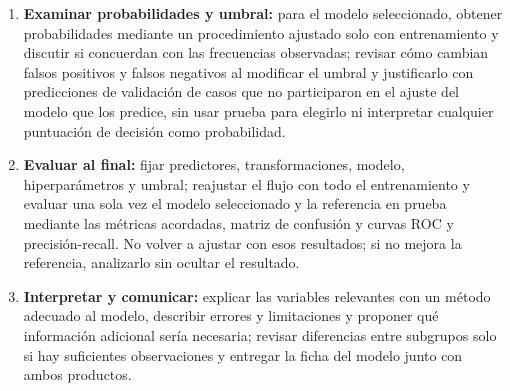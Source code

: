 \documentclass[a4,11pt]{aleph-notas}
\begin{document}
\begin{enumerate}[leftmargin=*, label={{\arabic*.}}]
    \item \textbf{Examinar probabilidades y umbral:} para el modelo seleccionado, obtener probabilidades mediante un procedimiento ajustado solo con entrenamiento y discutir si concuerdan con las frecuencias observadas; revisar cómo cambian falsos positivos y falsos negativos al modificar el umbral y justificarlo con predicciones de validación de casos que no participaron en el ajuste del modelo que los predice, sin usar prueba para elegirlo ni interpretar cualquier puntuación de decisión como probabilidad.
    \item \textbf{Evaluar al final:} fijar predictores, transformaciones, modelo, hiperparámetros y umbral; reajustar el flujo con todo el entrenamiento y evaluar una sola vez el modelo seleccionado y la referencia en prueba mediante las métricas acordadas, matriz de confusión y curvas ROC y precisión-recall. No volver a ajustar con esos resultados; si no mejora la referencia, analizarlo sin ocultar el resultado.
    \item \textbf{Interpretar y comunicar:} explicar las variables relevantes con un método adecuado al modelo, describir errores y limitaciones y proponer qué información adicional sería necesaria; revisar diferencias entre subgrupos solo si hay suficientes observaciones y entregar la ficha del modelo junto con ambos productos.
\end{enumerate}
\end{document}
